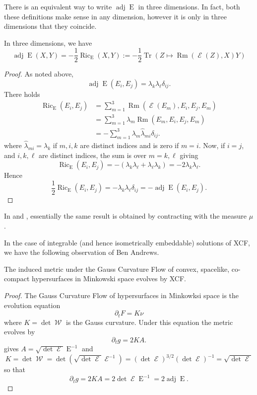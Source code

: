 \documentclass{cambridge7a}
\renewcommand{\~}{\tilde}
\renewcommand{\-}{\bar}
\newcommand{\8}{\infty}
\DeclareMathOperator{\Tr}{Tr}
\DeclareMathOperator{\Ric}{Ric}
\DeclareMathOperator{\Rm}{Rm}
\DeclareMathOperator{\Ein}{E}
\DeclareMathOperator{\opEin}{\mathcal{E}}
\DeclareMathOperator{\W}{\mathcal{W}}
\DeclareMathOperator{\adj}{adj}
\newcommand{\br}[1]{\left(#1\right)}
\begin{document}
There is an equivalent way to write \(\adj\Ein\) in three dimensions. In fact, both these definitions make sense in any dimension, however it is only in three dimensions that they coincide.
\begin{lemma}
\label{lem:xcf_equiv}

In three dimensions, we have
\[
\adj\Ein(X, Y) = -\frac{1}{2} \Ric_{\Ein} (X, Y) :=- \frac{1}{2} \Tr \br{Z \mapsto \Rm(\opEin(Z), X) Y}
\]
\end{lemma}
\begin{proof}
As noted above,
\[
\adj\Ein(E_i, E_j) = \lambda_k \lambda_{\ell} \delta_{ij}.
\]
There holds
\[
\begin{split}
\Ric_{\Ein}(E_i, E_j) &= \sum_{m=1}^3 \Rm(\opEin(E_m), E_i, E_j, E_m) \\
&= \sum_{m=1}^3 \lambda_m \Rm(E_m, E_i, E_j, E_m) \\
&= -\sum_{m=1}^3 \lambda_m \hat{\lambda}_{mi}\delta_{ij}.
\end{split}
\]
where \(\hat{\lambda}_{mi} = \lambda_k\) if \(m,i,k\) are distinct indices and is zero if \(m=i\). Now, if \(i = j\), and \(i, k, \ell\) are distinct indices, the sum is over \(m=k, \ell\) giving
\[
\Ric_{\Ein}(E_i, E_j) = -\left(\lambda_k \lambda_{\ell} + \lambda_{\ell} \lambda_k\right) = -2\lambda_k \lambda_{\ell}.
\]
Hence
\[
\frac{1}{2} \Ric_{\Ein}(E_i, E_j) =  -\lambda_k \lambda_{\ell} \delta_{ij} = -\adj\Ein(E_i, E_j).
\]
\end{proof}

\begin{rem}
In \cite[Lemma 3]{MR2055396} and \cite[Equation (3)]{MR2207496}, essentially the same result is obtained by contracting with the measure \(\mu\).
\end{rem}

In the case of integrable (and hence isometrically embeddable) solutions of XCF, we have the following observation of Ben Andrews.

\begin{lemma}[{\cite[Section 12]{MR3344442}}]
\label{lem:xcf_gcf}
The induced metric under the Gauss Curvature Flow of convex, spacelike, co-compact hypersurfaces in Minkowski space evolves by XCF.
\end{lemma}

\begin{proof}
The Gauss Curvature Flow of hypersurfaces in Minkowksi space is the evolution equation
\[
\partial_t F = K\nu
\]
where \(K = \det \W\) is the Gauss curvature. Under this equation the metric evolves by
\[
\partial_t g = 2KA.
\]
 gives \(A = \sqrt{\det \opEin} \Ein^{-1}\) and
\[
K = \det \W = \det (\sqrt{\det \opEin} \opEin^{-1}) = (\det \opEin)^{3/2} (\det \opEin)^{-1} = \sqrt{\det \opEin}
\]
so that
\[
\partial_t g = 2KA = 2 \det \opEin \Ein^{-1} = 2 \adj \Ein.
\]
\end{proof}
\end{document}
